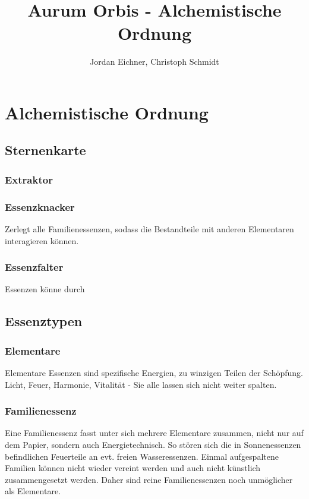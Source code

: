 \documentclass[a4paper,12pt,oneside]{book}
\title{Aurum Orbis - Alchemistische Ordnung}
\author{Jordan Eichner, Christoph Schmidt}
\date{}
\begin{document}
\maketitle
\tableofcontents

\part{Alchemistische Ordnung}

\chapter{Sternenkarte}

\section{Extraktor}


\section{Essenzknacker}
Zerlegt alle Familienessenzen, sodass die Bestandteile mit anderen Elementaren interagieren können.

\section{Essenzfalter}
Essenzen könne durch

\chapter{Essenztypen}

\section{Elementare}
Elementare Essenzen sind spezifische Energien, zu winzigen Teilen der Schöpfung. Licht, Feuer, Harmonie, Vitalität - Sie alle lassen sich nicht weiter spalten. 

\section{Familienessenz}
Eine Familienessenz fasst unter sich mehrere Elementare zusammen, nicht nur auf dem Papier, sondern auch Energietechnisch. So stören sich die in Sonnenessenzen befindlichen Feuerteile an evt. freien Wasseressenzen. Einmal aufgespaltene Familien können nicht wieder vereint werden und auch nicht künstlich zusammengesetzt werden. Daher sind reine Familienessenzen noch unmöglicher als Elementare.
\end{document}
